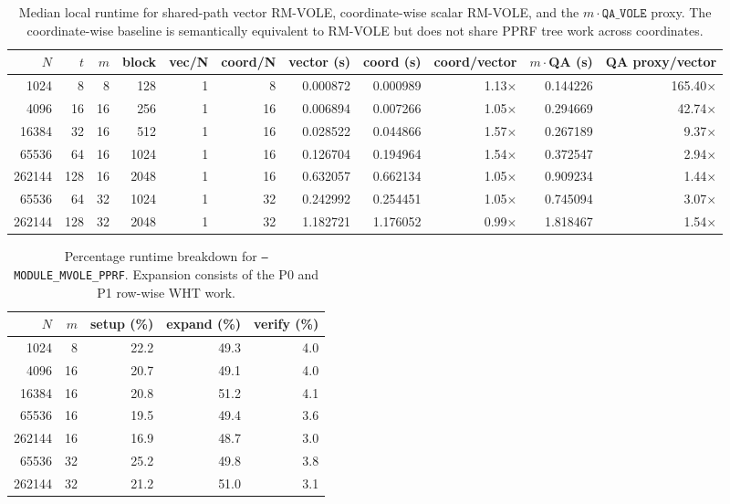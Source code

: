 \begin{table}[t]
\centering
\small
\begin{tabular}{rrrrrrrrrrr}
\toprule
\(N\) & \(t\) & \(m\) & block & vec/N & coord/N & vector (s) & coord (s) & coord/vector & \(m\cdot\)QA (s) & QA proxy/vector \\
\midrule
1024 & 8 & 8 & 128 & 1 & 8 & 0.000872 & 0.000989 & 1.13$\times$ & 0.144226 & 165.40$\times$ \\
4096 & 16 & 16 & 256 & 1 & 16 & 0.006894 & 0.007266 & 1.05$\times$ & 0.294669 & 42.74$\times$ \\
16384 & 32 & 16 & 512 & 1 & 16 & 0.028522 & 0.044866 & 1.57$\times$ & 0.267189 & 9.37$\times$ \\
65536 & 64 & 16 & 1024 & 1 & 16 & 0.126704 & 0.194964 & 1.54$\times$ & 0.372547 & 2.94$\times$ \\
262144 & 128 & 16 & 2048 & 1 & 16 & 0.632057 & 0.662134 & 1.05$\times$ & 0.909234 & 1.44$\times$ \\
65536 & 64 & 32 & 1024 & 1 & 32 & 0.242992 & 0.254451 & 1.05$\times$ & 0.745094 & 3.07$\times$ \\
262144 & 128 & 32 & 2048 & 1 & 32 & 1.182721 & 1.176052 & 0.99$\times$ & 1.818467 & 1.54$\times$ \\
\bottomrule
\end{tabular}
\caption{Median local runtime for shared-path vector RM-VOLE, coordinate-wise scalar RM-VOLE, and the \(m\cdot\texttt{QA\_VOLE}\) proxy. The coordinate-wise baseline is semantically equivalent to RM-VOLE but does not share PPRF tree work across coordinates.}
\label{tab:module-mvole-semantic-baseline}
\end{table}

\begin{table}[t]
\centering
\small
\begin{tabular}{rrrrr}
\toprule
\(N\) & \(m\) & setup (\%) & expand (\%) & verify (\%) \\
\midrule
1024 & 8 & 22.2 & 49.3 & 4.0 \\
4096 & 16 & 20.7 & 49.1 & 4.0 \\
16384 & 16 & 20.8 & 51.2 & 4.1 \\
65536 & 16 & 19.5 & 49.4 & 3.6 \\
262144 & 16 & 16.9 & 48.7 & 3.0 \\
65536 & 32 & 25.2 & 49.8 & 3.8 \\
262144 & 32 & 21.2 & 51.0 & 3.1 \\
\bottomrule
\end{tabular}
\caption{Percentage runtime breakdown for \texttt{--MODULE\_MVOLE\_PPRF}. Expansion consists of the P0 and P1 row-wise WHT work.}
\label{tab:module-mvole-breakdown}
\end{table}

